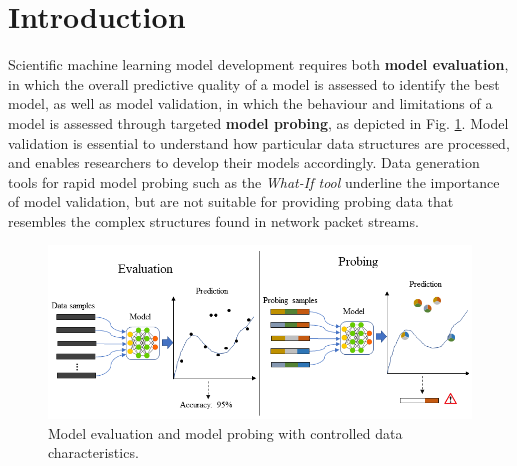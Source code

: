 \documentclass[runningheads]{llncs}
\begin{document}


\section{Introduction}




Scientific machine learning model development requires both \textbf{model evaluation}, in which the overall predictive quality of a model is assessed to identify the best model, as well as model validation, in which the behaviour and limitations of a model is assessed through targeted \textbf{model probing}, as depicted in Fig. \ref{Fig:Prob}. Model validation is essential to understand how particular data structures are processed, and enables researchers to develop their models accordingly. Data generation tools for rapid model probing such as the \textit{What-If tool} \cite{wexler2019if} underline the importance of model validation, but are not suitable for providing probing data that resembles the complex structures found in network packet streams.

\begin{figure}
\centering
\includegraphics[width=\textwidth]{images/Eva_Prob.png}
\caption{Model evaluation and model probing with controlled data characteristics.}\label{Fig:Prob}
\end{figure}
\end{document}
